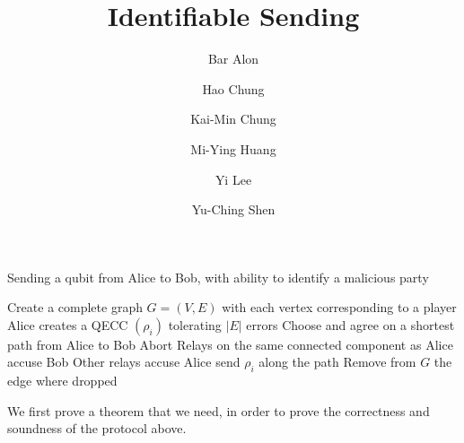 \documentclass{article}
\title{Identifiable Sending}
\author[1]{Bar Alon}
\author[2]{Hao Chung}
\author[3]{Kai-Min Chung}
\author[4]{Mi-Ying Huang}
\author[5]{Yi Lee}
\author[6]{Yu-Ching Shen}
\affil[1]{Ariel University, Israel}
\affil[2, 3, 4, 5, 6]{Institute of Information Science, Academia Sinica, Taiwan}
\begin{document}
\maketitle

\begin{algorithm}
	\caption{Sending a qubit from Alice to Bob, with ability to identify a malicious party}
	\label{isalg}
	\begin{algorithmic}[1]
		\State Create a complete graph $G=(V, E)$ with each vertex corresponding to a player
		\State Alice creates a QECC $(\rho_i)$ tolerating $|E|$ errors
			\State Choose and agree on a shortest path from Alice to Bob
				\State Abort
				\State Relays on the same connected component as Alice accuse Bob
				\State Other relays accuse Alice
			\EndIf
		\State send $\rho_i$ along the path
			\State Remove from $G$ the edge where dropped
		\EndIf
		\EndFor
	\end{algorithmic}
\end{algorithm}

We first prove a theorem that we need, in order to prove the correctness and soundness of the protocol above.
\end{document}
